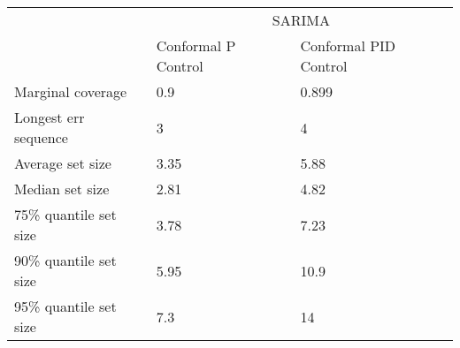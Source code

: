 \begin{tabular}{lll}
\toprule
& \multicolumn{2}{c}{SARIMA} \\
& Conformal P Control & Conformal PID Control \\
\midrule
Marginal coverage & 0.9 & 0.899 \\
Longest err sequence & 3 & 4 \\
Average set size & 3.35 & 5.88 \\
Median set size & 2.81 & 4.82 \\
75\% quantile set size & 3.78 & 7.23 \\
90\% quantile set size & 5.95 & 10.9 \\
95\% quantile set size & 7.3 & 14 \\
\bottomrule
\end{tabular}
